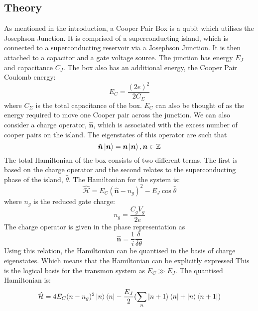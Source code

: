 \documentclass[11pt]{article}
\newcommand*{\hatH}{\hat{\mathcal{H}}}
\begin{document}
\subsection{Theory}
As mentioned in the introduction, a Cooper Pair Box is a qubit which utilises the Josephson Junction. It is comprised of a superconducting island, which is connected to a superconducting reservoir via a Josephson Junction. It is then attached to a capacitor and a gate voltage source. The junction has energy $E_J$ and capacitance $C_J$. The box also has an additional energy, the Cooper Pair Coulomb energy:
\begin{equation} \label{eq:1}
E_C =  \frac{(2e)^2}{2C_\Sigma}
\end{equation}
where $C_\Sigma$ is the total capacitance of the box. $E_C$ can also be thought of as the energy required to move one Cooper pair across the junction. We can also consider a charge operator, $\boldsymbol{\hat{n}}$, which is associated with the excess number of cooper pairs on the island. The eigenstates of this operator are such that
\begin{equation} \label{eq:2}
\boldsymbol{\hat{n}}\ket{\boldsymbol{n}} = \boldsymbol{n}\ket{\boldsymbol{n}},  \boldsymbol{n} \in \mathbb{Z}
\end{equation}
The total Hamiltonian of the box consists of two different terms. The first is based on the charge operator and the second relates to the superconducting phase of the island, $\hat{\theta}$. The Hamiltonian for the system is:
\begin{equation} \label{eq:3}
\hatH = E_C (\boldsymbol{\hat{n}} - n_g)^2 - E_J \cos{\hat{\theta}}
\end{equation}
where $n_g$ is the reduced gate charge:
\begin{equation} \label{eq:4}
n_g = \frac{C_g V_g}{2e}
\end{equation}
The charge operator is given in the phase representation as
\begin{equation} \label{eq:5}
\boldsymbol{\hat{n}} = \frac{1}{i} \frac{\delta}{\delta\theta}
\end{equation}
Using this relation, the Hamiltonian can be quantised in the basis of charge eigenstates. Which means that the Hamiltonian can be explicitly expressed  This is the logical basis for the transmon system as $E_C \gg E_J$. The quantised Hamiltonian is:
\begin{equation} \label{eq:6}
\hatH = 4E_C (n-n_g)^2 \ket{n}\bra{n} - \frac{E_J}{2}(\sum_{n} \ket{n+1}\bra{n} + \ket{n}\bra{n+1})
\end{equation}
\end{document}

